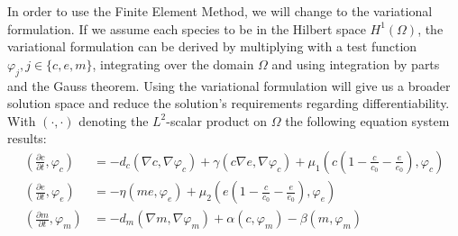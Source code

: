 In order to use the Finite Element Method, we will change to the variational formulation. If we assume each species to be in the Hilbert space $H^1(\Omega)$, the variational formulation can be derived by multiplying with a test function $\varphi_j, j\in \{c,e,m\}$, integrating over the domain $\Omega$ and using integration by parts and the Gauss theorem. Using the variational formulation will give us a broader solution space and reduce the solution's requirements regarding differentiability. With $\left(\cdot, \cdot\right)$ denoting the $L^2$-scalar product on $\Omega$ the following equation system results:
\begin{align}
    \left(\frac{\partial c}{\partial t}, \varphi_c\right) &=
        - d_c\left(\nabla c, \nabla \varphi_c\right) + \gamma \left(c\nabla e, \nabla \varphi_c\right) + \mu_1 \left(c \left(1-\frac{c}{c_0} - \frac{e}{e_0}\right), \varphi_c\right) \label{eq:11}\\
    \left(\frac{\partial e}{\partial t}, \varphi_e\right) &=  -\eta \left( me, \varphi_e\right) + \mu_2 \left(e\left(1-\frac{c}{c_0}-\frac{e}{e_0}\right),\varphi_e\right) \label{eq:12}\\
    \left(\frac{\partial m}{\partial t}, \varphi_m\right) &= -d_m \left(\nabla m,\nabla \varphi_m\right) + \alpha \left(c,\varphi_m\right) - \beta \left(m,\varphi_m\right) \label{eq:13}
\end{align}
